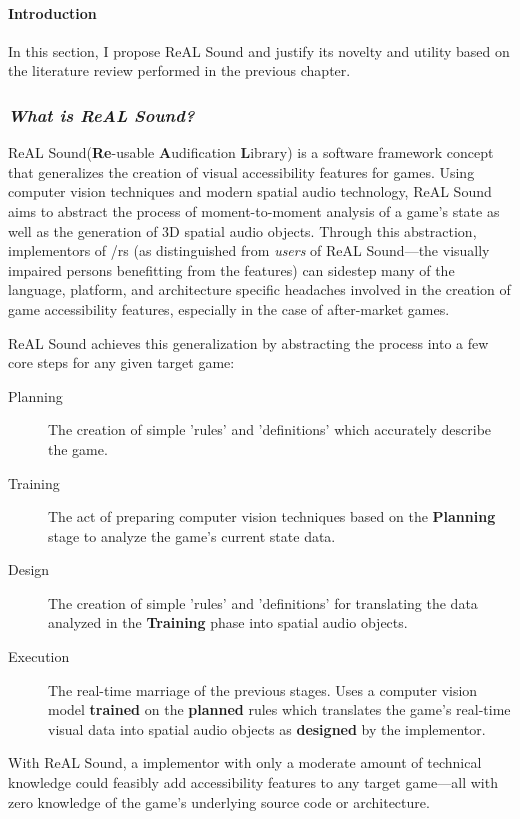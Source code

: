 \documentclass{report}
\newcommand{\rs}{ReAL Sound\xspace}
\newcommand{\rsfull}{\textbf{Re}-usable \textbf{A}udification \textbf{L}ibrary\xspace}
\begin{document}
\paragraph{Introduction} 

In this section, I propose \rs and justify its novelty and utility based on the literature review performed in the previous chapter.

\subsubsection{\emph{What is \rs?}}
\rs (\rsfull) is a software framework concept that generalizes the creation of visual accessibility features for games. Using computer vision techniques and modern spatial audio technology, \rs aims to abstract the process of moment-to-moment analysis of a game's state as well as the generation of 3D spatial audio objects. Through this abstraction, implementors of /rs (as distinguished from \emph{users} of \rs---the visually impaired persons benefitting from the features) can sidestep many of the language, platform, and architecture specific headaches involved in the creation of game accessibility features, especially in the case of after-market games. 

\rs achieves this generalization by abstracting the process into a few core steps for any given target game:

\begin{description}
    \item [Planning] The creation of simple 'rules' and 'definitions' which accurately describe the game.
    \item [Training] The act of preparing computer vision techniques based on the \textbf{Planning} stage to analyze the game's current state data.
    \item [Design] The creation of simple 'rules' and 'definitions' for translating the data analyzed in the \textbf{Training} phase into spatial audio objects. 
    \item [Execution] The real-time marriage of the previous stages. Uses a computer vision model \textbf{trained} on the \textbf{planned} rules which translates the game's real-time visual data into spatial audio objects as \textbf{designed} by the implementor.    
\end{description}

With \rs, a implementor with only a moderate amount of technical knowledge  could feasibly add accessibility features to any target game---all with zero knowledge of the game's underlying source code or architecture.
\end{document}

